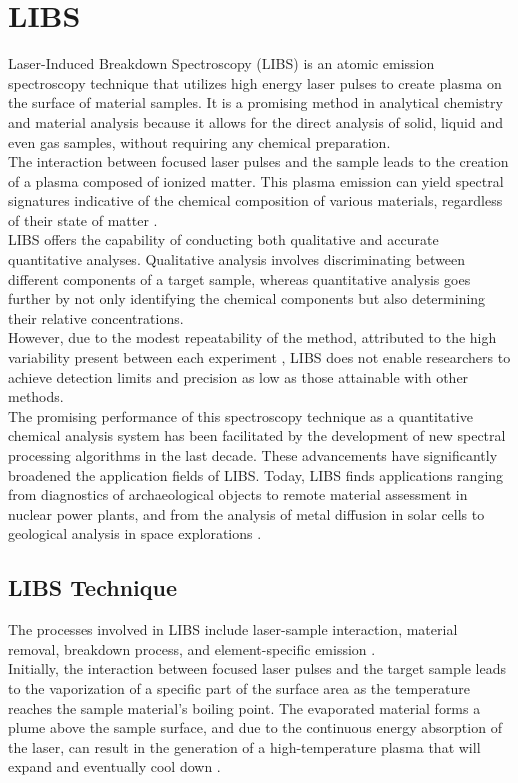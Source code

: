 \label{ch:experimental_techniques}

\section{LIBS}
\label{sec:LIBS}
Laser-Induced Breakdown Spectroscopy (LIBS) is an atomic emission spectroscopy technique that utilizes high energy laser pulses to create plasma on the surface of material samples. It is a promising method in analytical chemistry and material analysis because it allows for the direct analysis of solid, liquid and even gas samples, without requiring any chemical preparation.
\\
The interaction between focused laser pulses and the sample leads to the creation of a plasma composed of ionized matter. This plasma emission can yield spectral signatures indicative of the chemical composition of various materials, regardless of their state of matter \cite{miziolekLaserInducedBreakdown2006}. 
\\
LIBS offers the capability of conducting both qualitative and accurate quantitative analyses. Qualitative analysis involves discriminating between different components of a target sample, whereas quantitative analysis goes further by not only identifying the chemical components but also determining their relative concentrations.
\\
However, due to the modest repeatability of the method, attributed to the high variability present between each experiment \cite{michelReviewApplicationsSingleshot2010}, LIBS does not enable researchers to achieve detection limits and precision as low as those attainable with other methods. 
\\
The promising performance of this spectroscopy technique as a quantitative chemical analysis system has been facilitated by the development of new spectral processing algorithms in the last decade. These advancements have significantly broadened the application fields of LIBS. Today, LIBS finds applications ranging from diagnostics of archaeological objects to remote material assessment in nuclear power plants, and from the analysis of metal diffusion in solar cells to geological analysis in space explorations \cite{leeRecentApplicationsLaserInduced2004}.

\subsection{LIBS Technique}
\label{subsec:LIBS_technique}
The processes involved in LIBS include laser-sample interaction, material removal, breakdown process, and element-specific emission \cite{anabitarteLaserInducedBreakdownSpectroscopy2012}.
\\
Initially, the interaction between focused laser pulses and the target sample leads to the vaporization of a specific part of the surface area as the temperature reaches the sample material's boiling point. The evaporated material forms a plume above the sample surface, and due to the continuous energy absorption of the laser, can result in the generation of a high-temperature plasma that will expand and eventually cool down \cite{fortesLaserinducedBreakdownSpectroscopy2013}.

